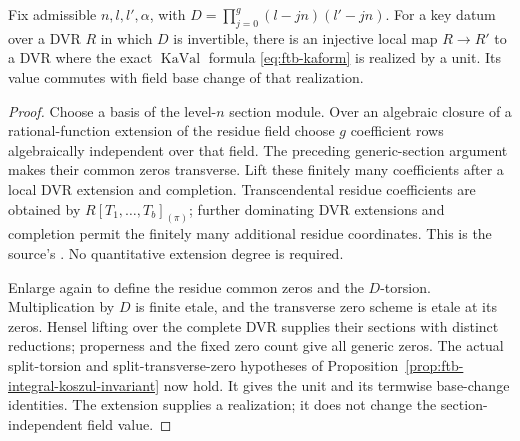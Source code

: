 \begin{srlemma}
\label{lem:ftb-key-dvr-realization}
Fix admissible \(n,l,l',\alpha\), with
\(D=\prod_{j=0}^g(l-jn)(l'-jn)\).
For a key datum over a DVR \(R\) in which \(D\) is invertible,
there is an injective local map \(R\to R'\) to a DVR where
the exact \(\operatorname{KaVal}\) formula
\eqref{eq:ftb-kaform} is realized by a unit.
Its value commutes with field base change of that realization.
\end{srlemma}
\begin{proof}
Choose a basis of the level-\(n\) section module.
Over an algebraic closure of a rational-function extension of the
residue field choose \(g\) coefficient rows algebraically independent
over that field.  The preceding generic-section argument makes
their common zeros transverse.
Lift these finitely many coefficients after a local DVR extension
and completion.  Transcendental residue coefficients are obtained
by \(R[T_1,\ldots,T_b]_{(\pi)}\); further dominating DVR extensions
and completion permit the finitely many additional residue
coordinates.  This is the source's
.
No quantitative extension degree is required.

Enlarge again to define the residue common zeros and the
\(D\)-torsion.  Multiplication by \(D\) is finite etale, and the
transverse zero scheme is etale at its zeros.  Hensel lifting over
the complete DVR supplies their sections with distinct reductions;
properness and the fixed zero count give all generic zeros.
The actual split-torsion and split-transverse-zero hypotheses
of Proposition~\ref{prop:ftb-integral-koszul-invariant} now hold.
It gives the unit and its termwise base-change identities.
The extension supplies a realization; it does not change the
section-independent field value.
\end{proof}

